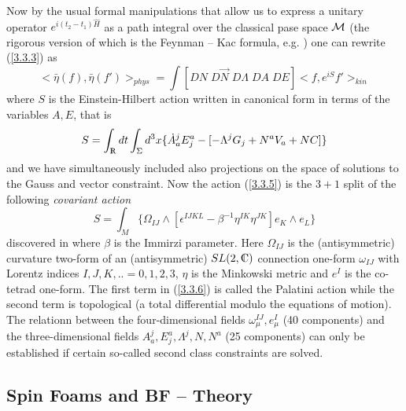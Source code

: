 \documentclass[12pt]{report}
\def\be{\begin{equation}}
\def\ee{\end{equation}}
\def\Rl{{\mathchoice
{\setbox0=\hbox{$\displaystyle\rm R$}\hbox{\hbox to0pt
{\kern0.4\wd0\vrule height0.9\ht0\hss}\box0}}
{\setbox0=\hbox{$\textstyle\rm R$}\hbox{\hbox to0pt
{\kern0.4\wd0\vrule height0.9\ht0\hss}\box0}}
{\setbox0=\hbox{$\scriptstyle\rm R$}\hbox{\hbox to0pt
{\kern0.4\wd0\vrule height0.9\ht0\hss}\box0}}
{\setbox0=\hbox{$\scriptscriptstyle\rm R$}\hbox{\hbox to0pt
{\kern0.4\wd0\vrule height0.9\ht0\hss}\box0}}}}
\def\Cl{{\mathchoice
{\setbox0=\hbox{$\displaystyle\rm C$}\hbox{\hbox to0pt
{\kern0.4\wd0\vrule height0.9\ht0\hss}\box0}}
{\setbox0=\hbox{$\textstyle\rm C$}\hbox{\hbox to0pt
{\kern0.4\wd0\vrule height0.9\ht0\hss}\box0}}
{\setbox0=\hbox{$\scriptstyle\rm C$}\hbox{\hbox to0pt
{\kern0.4\wd0\vrule height0.9\ht0\hss}\box0}}
{\setbox0=\hbox{$\scriptscriptstyle\rm C$}\hbox{\hbox to0pt
{\kern0.4\wd0\vrule height0.9\ht0\hss}\box0}}}}
\begin{document}
Now by the usual formal manipulations that allow us to express 
a unitary operator $e^{i(t_2-t_1) \hat{H}}$ as a path integral over the 
classical pase space $\cal M$ (the rigorous version of which is the
Feynman -- Kac formula, e.g. \cite{49}) one can rewrite (\ref{3.3.3})
as 
\be \label{3.3.4}
<\bar{\eta}(f),\bar{\eta}(f')>_{phys}
=\int [DN\;D\vec{N}\;D\Lambda\;DA\;DE] <f,e^{i S} f'>_{kin}
\ee
where $S$ is the Einstein-Hilbert action written in canonical form in 
terms of the variables $A,E$, that is
\be \label{3.3.5}
S=\int_\Rl dt \int_\Sigma d^3x \{\dot{A}_a^j E^a_j-[-\Lambda^j G_j+
N^a V_a+NC]\}
\ee
and we have simultaneously included also
projections on the space of solutions to the Gauss and vector constraint.
Now the action (\ref{3.3.5}) is the $3+1$ split of the following 
{\it covariant action}
\be \label{3.3.6}
S=\int_M \{\Omega_{IJ}\wedge[\epsilon^{IJKL}-\beta^{-1}\eta^{IK}\eta^{JK}]
e_K\wedge e_L\}
\ee
discovered in \cite{50} where $\beta$ is the Immirzi parameter. 
Here $\Omega_{IJ}$ is the (antisymmetric) curvature two-form of an 
(antisymmetric) $SL(2,\Cl)$ connection 
one-form $\omega_{IJ}$ with Lorentz indices $I,J,K,..=0,1,2,3$, $\eta$ is 
the Minkowski metric and $e^I$ is the co-tetrad one-form. The first 
term in (\ref{3.3.6}) is called the Palatini action while the second
term is topological (a total differential modulo the equations of motion). 
The relationn between the four-dimensional fields 
$\omega^{IJ}_\mu,e^I_\mu$ (40 components) and 
the three-dimensional fields $A_a^j,E^a_j,\Lambda^j,N,N^a$ (25 components)
can only be established if certain so-called second class constraints
\cite{17} are solved.  


\subsection{Spin Foams and BF -- Theory}
\label{s3.3.2}
\end{document}
